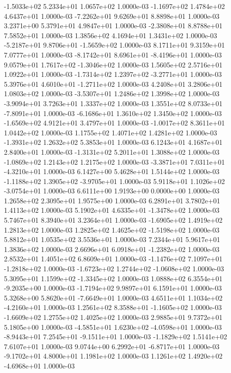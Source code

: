 -1.5033e+02  5.2334e+01  1.0657e+02  1.0000e-03
-1.1697e+02  1.4784e+02  4.6437e+01  1.0000e-03
-7.2262e+01  9.6269e+01  8.8898e+01  1.0000e-03
3.2371e+00 5.3791e+01 4.9847e+01  1.0000e-03
-2.3808e+01  8.8788e+01  7.5852e+01  1.0000e-03
1.3856e+02 4.1694e+01 1.3431e+02  1.0000e-03
-5.2187e+01  9.8706e+01 -1.5659e+02  1.0000e-03
8.1711e+01 9.3159e+01 7.0777e+01  1.0000e-03
-8.1742e+01  8.6961e+01 -8.4196e+01  1.0000e-03
 9.0579e+01  1.7617e+02 -1.3046e+02  1.0000e-03
1.5605e+02 2.5716e+01 1.0922e+01  1.0000e-03
-1.7314e+02  1.2397e+02 -3.2771e+01  1.0000e-03
 5.3976e+01  4.6010e+01 -1.2711e+02  1.0000e-03
4.2408e+01 3.2806e+01 1.0803e+02  1.0000e-03
-3.5307e+01  1.2486e+02  1.3998e+02  1.0000e-03
-3.9094e+01  3.7263e+01  1.3337e+02  1.0000e-03
 1.3551e+02  8.0733e+01 -7.8091e+01  1.0000e-03
-6.1686e+01  1.3610e+02  1.3450e+02  1.0000e-03
-1.6569e+02  4.9121e+01  3.4797e+01  1.0000e-03
-1.0017e+02  8.3611e+01  1.0442e+02  1.0000e-03
1.1755e+02 1.4071e+02 1.4281e+02  1.0000e-03
-1.3931e+02  1.2632e+02  5.3853e+01  1.0000e-03
6.1243e+01 4.1687e+01 2.8400e+01  1.0000e-03
-1.3131e+02  5.2011e+01  1.3088e+02  1.0000e-03
-1.0869e+02  1.2143e+02  1.2175e+02  1.0000e-03
-3.3871e+01  7.0311e+01 -4.3210e+01  1.0000e-03
6.1427e+00 5.4628e+01 1.5144e+02  1.0000e-03
-1.1188e+02  1.3905e+02 -3.9705e+01  1.0000e-03
 5.9118e+01  1.1026e+02 -3.0754e+01  1.0000e-03
6.6111e+00 1.9193e+00 0.0000e+00  1.0000e-03
1.2658e+02 2.3095e+01 1.9575e+00  1.0000e-03
6.2891e+01 3.7802e+01 1.4113e+02  1.0000e-03
 5.1902e+01  4.6335e+01 -1.3478e+02  1.0000e-03
5.7467e+01 8.3940e+01 3.2364e+01  1.0000e-03
-1.6905e+02  1.4919e+02  1.2813e+02  1.0000e-03
 1.2825e+02  1.4625e+02 -1.5198e+02  1.0000e-03
5.8812e+01 1.0535e+02 3.5536e+01  1.0000e-03
7.2344e+01 5.9617e+01 1.3836e+02  1.0000e-03
 2.6696e+01  6.0918e+01 -1.2382e+02  1.0000e-03
2.8532e+01 1.4051e+02 6.8609e+01  1.0000e-03
-1.1476e+02  7.1097e+01 -1.2818e+02  1.0000e-03
-1.6723e+02  1.2744e+02 -1.0608e+02  1.0000e-03
 5.3095e+01  1.1599e+02 -1.3345e+02  1.0000e-03
 1.0888e+02  6.3554e+01 -9.2035e+00  1.0000e-03
-1.7194e+02  9.9897e+01  6.1591e+01  1.0000e-03
 5.3268e+00  5.8620e+01 -7.6649e+01  1.0000e-03
 4.6511e+01  1.1034e+02 -4.2160e+01  1.0000e-03
 1.2561e+02  8.3588e+01 -1.1605e+02  1.0000e-03
-1.6609e+02  1.2755e+02  1.4025e+02  1.0000e-03
2.9885e+01 9.7372e+01 5.1805e+00  1.0000e-03
-4.5851e+01  1.6230e+02 -4.0598e+01  1.0000e-03
-8.9443e+01  7.2545e+01 -9.1511e+01  1.0000e-03
-1.1829e+02  1.5141e+02  7.6107e+01  1.0000e-03
 9.0744e+00  6.2992e+01 -6.8717e+01  1.0000e-03
-9.1702e+01  4.8000e+01  1.1981e+02  1.0000e-03
 1.1261e+02  1.4920e+02 -4.6968e+01  1.0000e-03
